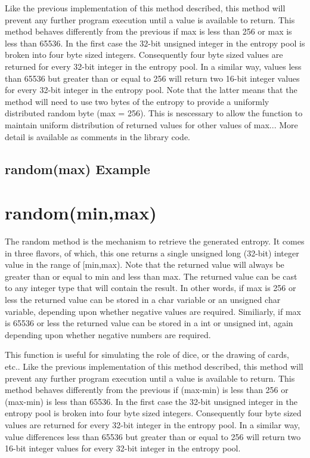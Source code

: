 \documentclass[10pt]{report}
\newcommand{\code}[2]{
 \hrulefill
 \subsection*{#1}
 
 \vspace{2em}
}
\begin{document}
Like the previous implementation of this method described, this method will prevent any further program execution until a value is available to return.  This method behaves differently
from the previous if max is less than 256 or max is less than 65536.  In the first case the 32-bit unsigned integer in the entropy pool is broken into four byte sized integers. 
Consequently four byte sized values are returned for every 32-bit integer in the entropy pool.  In a similar way, values less than 65536 but greater than or equal to 256 will return 
two 16-bit integer values for every 32-bit integer in the entropy pool.  Note that the latter means that the method will need to use two bytes of the entropy to provide a uniformly
distributed random byte (max = 256).  This is nescessary to allow the function to maintain uniform distribution of returned values for other values of max...  More detail is available 
as comments in the library code.

\code{random(max) Example}{random_max_example.ino}

\section{random(min,max)}

The random method is the mechanism to retrieve the generated entropy.  It comes in three flavors, of which, this one returns a single unsigned long (32-bit) integer value in the range
of [min,max).  Note that the returned value will always be greater than or equal to min and less than max.  The returned value can be cast to any integer type that will contain the 
result.  In other words, if max is 256 or less the returned value can be stored in a char variable or an unsigned char variable, depending upon whether negative values are required. 
Similiarly, if max is 65536 or less the returned value can be stored in a int or unsigned int, again depending upon whether negative numbers are required.  

This function is useful for simulating the role of dice, or the drawing of cards, etc..  Like the previous implementation of this method described, this method will prevent any further 
program execution until a value is available to return.  This method behaves differently from the previous if (max-min) is less than 256 or (max-min) is less than 65536.  In the first case the 
32-bit unsigned integer in the entropy pool is broken into four byte sized integers. Consequently four byte sized values are returned for every 32-bit integer in the entropy pool.  In
a similar way, value differences less than 65536 but greater than or equal to 256 will return two 16-bit integer values for every 32-bit integer in the entropy pool.  
\end{document}

